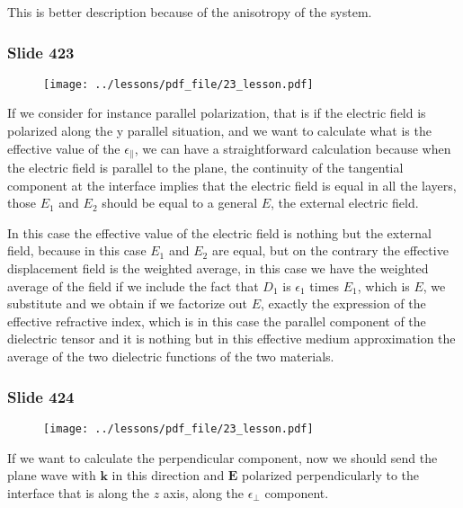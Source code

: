 \documentclass[../main/main.tex]{subfiles}
\begin{document}
This is better description because of the anisotropy of the system.

\newpage

\subsubsection{Slide 423}

\begin{figure}[h!]
\centering
\texttt{[image: ../lessons/pdf\_file/23\_lesson.pdf]}
\end{figure}

If we consider for instance parallel polarization, that is if the electric field is polarized along the y parallel situation, and we want to calculate what is the effective value of the $\epsilon_{\parallel}$, we can have a straightforward calculation because when the electric field is parallel to the plane, the continuity of the tangential component at the interface implies that the electric field is equal in all the layers, those $E_1$ and $E_2$ should be equal to a general $E$, the external electric field.

In this case the effective value of the electric field is nothing but the external field, because in this case $E_1$ and $E_2$ are equal, but on the contrary the effective displacement field is the weighted average, in this case we have the weighted average of the field if we include the fact that $D_1$ is $\epsilon_1$ times $E_1$, which is $E$, we substitute and we obtain if we factorize out $E$, exactly the expression of the effective refractive index, which is in this case the parallel component of the dielectric tensor and it is nothing but in this effective medium approximation the average of the two dielectric functions of the two materials.

\newpage

\subsubsection{Slide 424}

\begin{figure}[h!]
\centering
\texttt{[image: ../lessons/pdf\_file/23\_lesson.pdf]}
\end{figure}

If we want to calculate the perpendicular component, now we should send the plane wave with $\mathbf{k}$ in this direction and $\mathbf{E}$ polarized perpendicularly to the interface that is along the $z$ axis, along the $\epsilon_{\perp}$ component.
\end{document}
